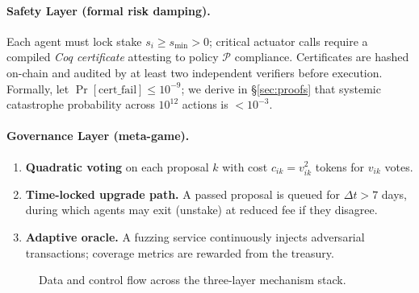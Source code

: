 \documentclass[12pt]{article}
\theoremstyle{plain}
\begin{document}
\paragraph{Safety Layer (formal risk damping).}
Each agent must lock stake $s_i\!\ge\!s_{\min}>0$;  
critical actuator calls require a compiled \emph{Coq certificate}
attesting to policy $\mathcal{P}$ compliance.  
Certificates are hashed on-chain and audited by at least two
independent verifiers before execution.  
Formally, let 
$\Pr[\text{cert\_fail}]\le 10^{-9}$;  
we derive in \S\ref{sec:proofs} that systemic catastrophe probability
across $10^{12}$ actions is $<10^{-3}$.

\paragraph{Governance Layer (meta-game).}
\begin{enumerate}\itemsep2pt
\item \textbf{Quadratic voting} on each proposal $k$ with cost
$c_{ik}=v_{ik}^2$ tokens for $v_{ik}$ votes.  
\item \textbf{Time-locked upgrade path.}  
A passed proposal is queued for $\Delta t\!>\!7$ days, during which
agents may exit (unstake) at reduced fee if they disagree.
\item \textbf{Adaptive oracle.}  
A fuzzing service continuously injects adversarial transactions;
coverage metrics are rewarded from the treasury.
\end{enumerate}

\begin{figure}[h]\centering
{}
\caption{Data and control flow across the three-layer mechanism stack.}
\label{fig:stack}
\end{figure}
\end{document}
